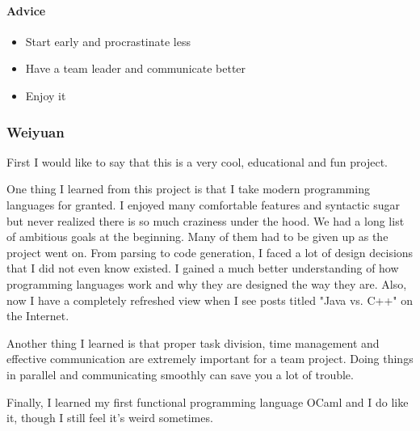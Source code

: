 \paragraph{Advice}
\begin{itemize}
  \item Start early and procrastinate less
  \item Have a team leader and communicate better
  \item Enjoy it
\end{itemize}


\subsubsection*{Weiyuan}
First I would like to say that this is a very cool, educational and fun project. 

One thing I learned from this project is that I take modern programming languages for granted. I enjoyed many comfortable features and syntactic sugar but never realized there is so much craziness under the hood. We had a long list of ambitious goals at the beginning. Many of them had to be given up as the project went on. From parsing to code generation, I faced a lot of design decisions that I did not even know existed. I gained a much better understanding of how programming languages work and why they are designed the way they are. Also, now I have a completely refreshed view when I see posts titled "Java vs. C++" on the Internet.

Another thing I learned is that proper task division, time management and effective communication are extremely important for a team project. Doing things in parallel and communicating smoothly can save you a lot of trouble.

Finally, I learned my first functional programming language OCaml and I do like it, though I still feel it's weird sometimes.
